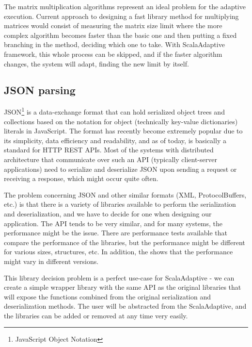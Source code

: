 The matrix multiplication algorithms represent an ideal problem for the adaptive execution. Current approach to designing a fast library method for multiplying matrices would consist of measuring the matrix size limit where the more complex algorithm becomes faster than the basic one and then putting a fixed branching in the method, deciding which one to take. With ScalaAdaptive framework, this whole process can be skipped, and if the faster algorithm changes, the system will adapt, finding the new limit by itself.

\subsection{JSON parsing}
\label{subsec:json_parsing}

JSON\footnote{JavaScript Object Notation} is a data-exchange format that can hold serialized object trees and collections based on the notation for object (technically key-value dictionaries) literals in JavaScript. The format has recently become extremely popular due to its simplicity, data efficiency and readability, and as of today, is basically a standard for HTTP REST APIs. Most of the systems with distributed architecture that communicate over such an API (typically client-server applications) need to serialize and deserialize JSON upon sending a request or receiving a response, which might occur quite often.


The problem concerning JSON and other similar formats (XML, ProtocolBuffers, etc.) is that there is a variety of libraries available to perform the serialization and deserialization, and we have to decide for one when designing our application. The API tends to be very similar, and for many systems, the performance might be the issue. There are performance tests available that compare the performance of the libraries, but the performance might be different for various sizes, structures, etc. In addition, the \cite{Trojanek:Thesis:2013} shows that the performance might vary in different versions.

This library decision problem is a perfect use-case for ScalaAdaptive - we can create a simple wrapper library with the same API as the original libraries that will expose the functions combined from the original serialization and deserialization methods. The user will be abstracted from the ScalaAdaptive, and the libraries can be added or removed at any time very easily.

